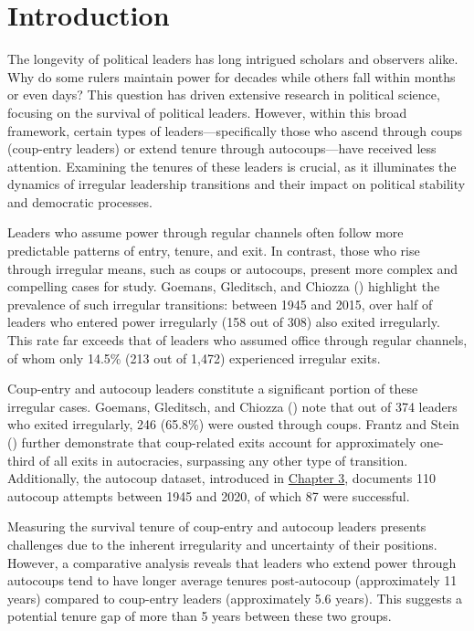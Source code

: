 \documentclass[
  12pt,
]{report}
\begin{document}
\section{Introduction}\label{introduction-3}

The longevity of political leaders has long intrigued scholars and
observers alike. Why do some rulers maintain power for decades while
others fall within months or even days? This question has driven
extensive research in political science, focusing on the survival of
political leaders. However, within this broad framework, certain types
of leaders---specifically those who ascend through coups (coup-entry
leaders) or extend tenure through autocoups---have received less
attention. Examining the tenures of these leaders is crucial, as it
illuminates the dynamics of irregular leadership transitions and their
impact on political stability and democratic processes.

Leaders who assume power through regular channels often follow more
predictable patterns of entry, tenure, and exit. In contrast, those who
rise through irregular means, such as coups or autocoups, present more
complex and compelling cases for study. Goemans, Gleditsch, and Chiozza
() highlight the prevalence of such
irregular transitions: between 1945 and 2015, over half of leaders who
entered power irregularly (158 out of 308) also exited irregularly. This
rate far exceeds that of leaders who assumed office through regular
channels, of whom only 14.5\% (213 out of 1,472) experienced irregular
exits.

Coup-entry and autocoup leaders constitute a significant portion of
these irregular cases. Goemans, Gleditsch, and Chiozza
() note that out of 374 leaders who
exited irregularly, 246 (65.8\%) were ousted through coups. Frantz and
Stein () further demonstrate that
coup-related exits account for approximately one-third of all exits in
autocracies, surpassing any other type of transition. Additionally, the
autocoup dataset, introduced in \hyperref[sec-chapter3]{Chapter 3},
documents 110 autocoup attempts between 1945 and 2020, of which 87 were
successful.

Measuring the survival tenure of coup-entry and autocoup leaders
presents challenges due to the inherent irregularity and uncertainty of
their positions. However, a comparative analysis reveals that leaders
who extend power through autocoups tend to have longer average tenures
post-autocoup (approximately 11 years) compared to coup-entry leaders
(approximately 5.6 years). This suggests a potential tenure gap of more
than 5 years between these two groups.
\end{document}
